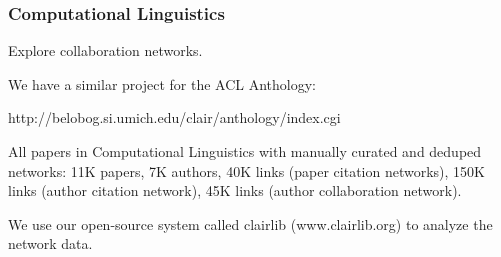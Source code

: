 \begin{frame}
  \frametitle{Computational Linguistics}

  Explore collaboration networks.

We have a similar project for the ACL Anthology:

http://belobog.si.umich.edu/clair/anthology/index.cgi

All papers in Computational Linguistics with manually curated and
deduped networks: 11K papers, 7K authors, 40K links (paper citation
networks), 150K links (author citation network), 45K links (author
collaboration network).

We use our open-source system called clairlib (www.clairlib.org) to
analyze the network data.

\end{frame}


